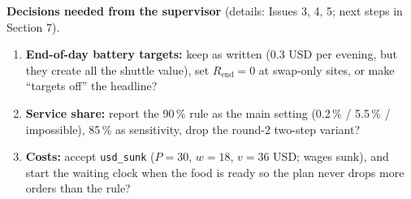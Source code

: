 \noindent\textbf{Decisions needed from the supervisor} (details: Issues 3, 4, 5; next steps in Section 7).
\begin{enumerate}\small\setlength{\itemsep}{0pt}
  \item \textbf{End-of-day battery targets:} keep as written (0.3 USD per evening, but they create all the shuttle value), set $R_{\mathrm{end}} = 0$ at swap-only sites, or make ``targets off'' the headline?
  \item \textbf{Service share:} report the 90\,\% rule as the main setting (0.2\,\% / 5.5\,\% / impossible), 85\,\% as sensitivity, drop the round-2 two-step variant?
  \item \textbf{Costs:} accept \texttt{usd\_sunk} ($P = 30$, $w = 18$, $v = 36$ USD; wages sunk), and start the waiting clock when the food is ready so the plan never drops more orders than the rule?
\end{enumerate}

\clearpage
